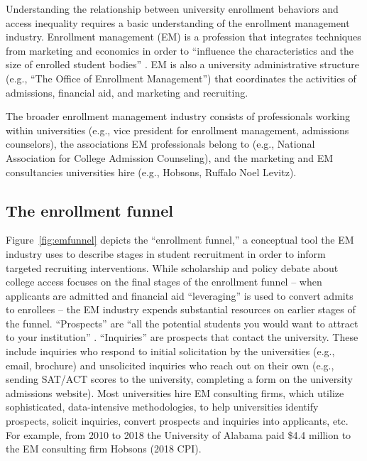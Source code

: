 \documentclass[twoside]{article}
\begin{document}
Understanding the relationship between university enrollment behaviors and access inequality requires a basic understanding of the enrollment management industry.  Enrollment management (EM) is a profession that integrates techniques from marketing and economics in order to ``influence the characteristics and the size of enrolled student bodies'' \citep[p.~xiv]{RN2771}.  EM is also a university administrative structure (e.g., ``The Office of Enrollment Management'') that coordinates the activities of admissions, financial aid, and marketing and recruiting.

The broader enrollment management industry consists of professionals working within universities (e.g., vice president for enrollment management, admissions counselors), the associations EM professionals belong to (e.g., National Association for College Admission Counseling), and the marketing and EM consultancies universities hire (e.g., Hobsons, Ruffalo Noel Levitz).

\subsection*{The enrollment funnel}


Figure~\ref{fig:emfunnel} depicts the ``enrollment funnel,'' a conceptual tool the EM industry uses to describe stages in student recruitment in order to inform targeted recruiting interventions.  While scholarship and policy debate about college access focuses on the final stages of the enrollment funnel -- when applicants are admitted \citep[e.g., ][]{RN3536} and financial aid ``leveraging'' is used to convert admits to enrollees \citep[e.g., ][]{RN1948} -- the EM industry expends substantial resources on earlier stages of the funnel.  ``Prospects'' are ``all the potential students you would want to attract to your institution'' \citep{RN4322}. ``Inquiries'' are prospects that contact the university. These include inquiries who respond to initial solicitation by the universities (e.g., email, brochure) and unsolicited inquiries who reach out on their own (e.g., sending SAT/ACT scores to the university, completing a form on the university admissions website).  Most universities hire EM consulting firms, which utilize sophisticated, data-intensive methodologies, to help universities identify prospects, solicit inquiries, convert prospects and inquiries into applicants, etc. For example, from 2010 to 2018 the University of Alabama paid \$4.4 million to the EM consulting firm Hobsons \citep{RN4035} (2018 CPI).
\end{document}
